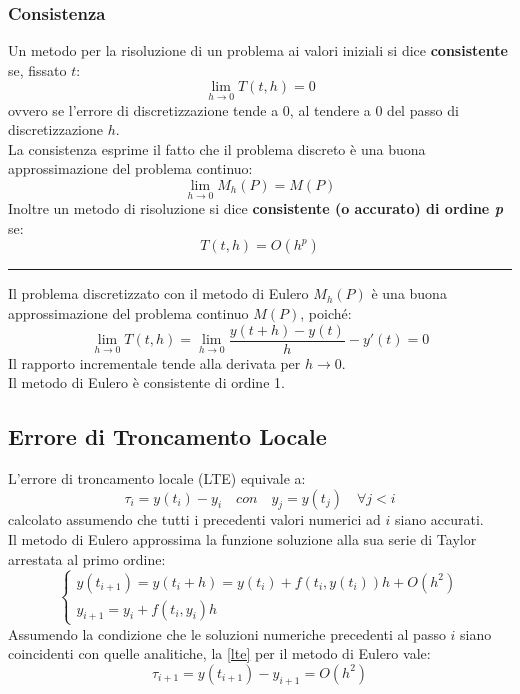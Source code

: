 \subsubsection{Consistenza}
Un metodo per la risoluzione di un problema ai valori iniziali si dice \textbf{consistente} se, fissato $t$:
\begin{equation*}
	\lim_{h \rightarrow 0} T(t,h) = 0
\end{equation*}
ovvero se l'errore di discretizzazione tende a 0, al tendere a 0 del passo di discretizzazione $h$.
\\La consistenza esprime il fatto che il problema discreto è una buona approssimazione del problema continuo:
\begin{equation*}
	\lim_{h \rightarrow 0} M_h(P) = M(P)
\end{equation*}
Inoltre un metodo di risoluzione si dice \textbf{consistente (o accurato) di ordine \textit{p}} se:
\begin{equation}
	T(t,h) = O(h^p)
\end{equation}
\hrule
\vspace{0.5cm}
Il problema discretizzato con il metodo di Eulero $M_h(P)$ è una buona approssimazione del problema continuo $M(P)$, poiché:
\begin{equation*}
	\lim_{h \rightarrow 0} T(t,h) = \lim_{h \rightarrow 0} \dfrac{y(t+h)-y(t)}{h} - y'(t) = 0
\end{equation*} 
Il rapporto incrementale tende alla derivata per $h \rightarrow 0$.
\\Il metodo di Eulero è consistente di ordine 1.

\subsection{Errore di Troncamento Locale}
L'errore di troncamento locale (LTE) equivale a:
\begin{equation}
	\label{lte}
	\tau_i = y(t_i) - y_i \quad con \quad y_j = y(t_j) \quad\forall j <i 
\end{equation}
calcolato assumendo che tutti i precedenti valori numerici ad $i$ siano accurati.
\\Il metodo di Eulero approssima la funzione soluzione alla sua serie di Taylor arrestata al primo ordine:
\begin{equation*}
	\begin{cases}
		y(t_{i+1}) = y(t_i+h) = y(t_i) + f(t_i, y(t_i))h + O(h^2) \\
		y_{i+1} = y_i + f(t_i, y_i)h
	\end{cases}
\end{equation*}
Assumendo la condizione che le soluzioni numeriche precedenti al passo $i$ siano coincidenti con quelle analitiche, la \ref{lte} per il metodo di Eulero vale:
\begin{equation}
	\tau_{i+1} = y(t_{i+1}) - y_{i+1} = O(h^2)
\end{equation}

